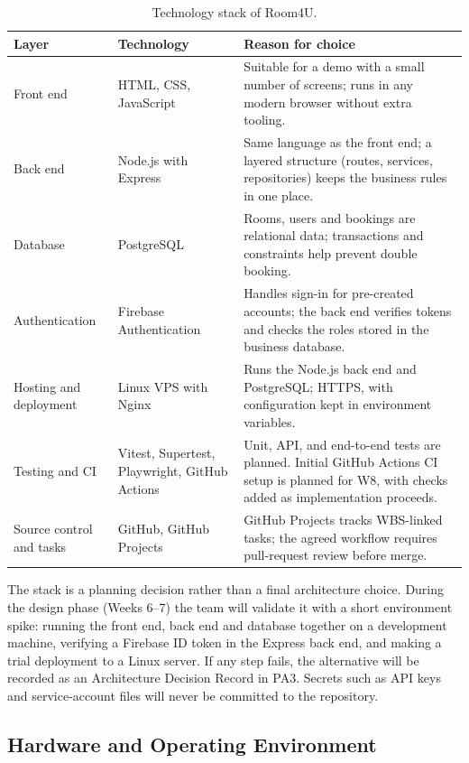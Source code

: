 \begin{table}[H]
\centering
\caption{Technology stack of Room4U.}
\label{tab:stack}
\begin{tabularx}{\textwidth}{@{}L{2.9cm}L{4.4cm}Y@{}}
\toprule
\textbf{Layer} & \textbf{Technology} & \textbf{Reason for choice}\\
\midrule
Front end & HTML, CSS, JavaScript &
  Suitable for a demo with a small number of screens; runs in any modern
  browser without extra tooling.\\
Back end & Node.js with Express &
  Same language as the front end; a layered structure (routes, services,
  repositories) keeps the business rules in one place.\\
Database & PostgreSQL &
  Rooms, users and bookings are relational data; transactions and
  constraints help prevent double booking.\\
Authentication & Firebase Authentication &
  Handles sign-in for pre-created accounts; the back end verifies tokens and
  checks the roles stored in the business database.\\
Hosting and deployment & Linux VPS with Nginx &
  Runs the Node.js back end and PostgreSQL; HTTPS, with configuration kept
  in environment variables.\\
Testing and CI & Vitest, Supertest, Playwright, GitHub Actions &
  Unit, API, and end-to-end tests are planned. Initial GitHub Actions CI setup
  is planned for W8, with checks added as implementation proceeds.\\
Source control and tasks & GitHub, GitHub Projects &
  GitHub Projects tracks WBS-linked tasks; the agreed workflow requires
  pull-request review before merge.\\
\bottomrule
\end{tabularx}
\end{table}

The stack is a planning decision rather than a final architecture choice.
During the design phase (Weeks 6--7) the team will validate it with a short
environment spike: running the front end, back end and database together on a
development machine, verifying a Firebase ID token in the Express back end, and
making a trial deployment to a Linux server. If any step fails, the
alternative will be recorded as an Architecture Decision Record in PA3.
Secrets such as API keys and service-account files will never be committed to
the repository.

\subsection{Hardware and Operating Environment}

